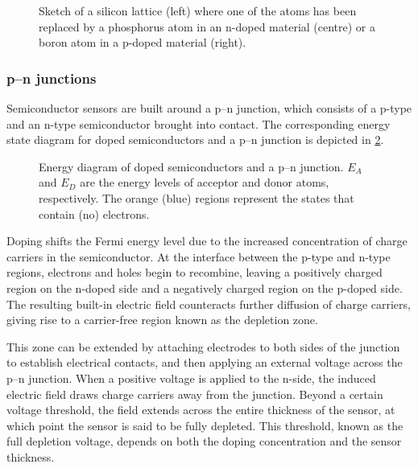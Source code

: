 \begin{figure}[h]
    \centering
    
    \caption{Sketch of a silicon lattice (left) where one of the atoms has been replaced by a phosphorus atom in an n-doped material (centre) or a boron atom in a p-doped material (right).}
    \label{fig:DopedSemiConductor}
\end{figure}


\subsubsection{p--n junctions}

Semiconductor sensors are built around a p--n junction, which consists of a p-type and an n-type semiconductor brought into contact. The corresponding energy state diagram for doped semiconductors and a p--n junction is depicted in \cref{fig:PNEnergy}.

\begin{figure}[h!]
    \centering
    
    \caption{Energy diagram of doped semiconductors and a p--n junction. $E_A$ and $E_D$ are the energy levels of acceptor and donor atoms, respectively. The orange (blue) regions represent the states that contain (no) electrons.}
    \label{fig:PNEnergy}
\end{figure}


Doping shifts the Fermi energy level due to the increased concentration of charge carriers in the semiconductor. At the interface between the p-type and n-type regions, electrons and holes begin to recombine, leaving a positively charged region on the n-doped side and a negatively charged region on the p-doped side. The resulting built-in electric field counteracts further diffusion of charge carriers, giving rise to a carrier-free region known as the depletion zone.

This zone can be extended by attaching electrodes to both sides of the junction to establish electrical contacts, and then applying an external voltage across the p--n junction. When a positive voltage is applied to the n-side, the induced electric field draws charge carriers away from the junction. Beyond a certain voltage threshold, the field extends across the entire thickness of the sensor, at which point the sensor is said to be fully depleted. This threshold, known as the full depletion voltage, depends on both the doping concentration and the sensor thickness.

\vspace{0.5 cm}

